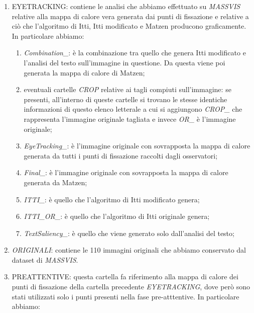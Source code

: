 \documentclass[%
	corpo=12pt,
    twoside,
    stile=classica,
    oldstyle,
    tipotesi=custom,
    greek,
    evenboxes,
]{toptesi}
\begin{document}
{\begin{itemize}
\begin{enumerate}
\begin{enumerate}
		\item \textit{EyeTracking\_}: immagine che contiene l’immagine originale alla quale viene sovrapposta la mappa di calore in base ai punti di fissazione;
		\item \textit{POLY\_AND\_POINTS\_}: Immagine con solo i poligoni disegnati su sfondo bianco e con i punti di fissazione che sono stati rappresentati all’interno del poligono opportuno;
		\item \textit{POLY\_ON\_IMG\_}: immagine con i poligoni sovrapposti all’immagine.
		\end{enumerate}
	\item EYETRACKING: contiene le analisi che abbiamo effettuato su \textit{MASSVIS} relative alla mappa di calore vera generata dai punti di fissazione e relative a ciò che l’algoritmo di Itti, Itti modificato e Matzen producono graficamente. In particolare abbiamo:
		\begin{enumerate}
		\item \textit{Combination\_}: è la combinazione tra quello che genera Itti modificato e l’analisi del testo sull’immagine in questione. Da questa viene poi generata la mappa di calore di Matzen;
		\item eventuali cartelle \textit{CROP} relative ai tagli compiuti sull’immagine: se presenti, all’interno di queste cartelle si trovano le stesse identiche informazioni di questo elenco letterale a cui si aggiungono \textit{CROP\_} che rappresenta l’immagine originale tagliata e invece \textit{OR\_} è l’immagine originale;
		\item \textit{EyeTracking\_}: è l’immagine originale con sovrapposta la mappa di calore generata da tutti i punti di fissazione raccolti dagli osservatori;
		\item \textit{Final\_}: è l’immagine originale con sovrapposta la mappa di calore generata da Matzen;
		\item \textit{ITTI\_}: è quello che l’algoritmo di Itti modificato genera;
		\item \textit{ITTI\_OR\_}: è quello che l’algoritmo di Itti originale genera;
		\item \textit{TextSaliency\_}: è quello che viene generato solo dall’analisi del testo;
		\end{enumerate}
	\item \textit{ORIGINALI}: contiene le 110 immagini originali che abbiamo conservato dal dataset di \textit{MASSVIS}.
	\item PREATTENTIVE: questa cartella fa riferimento alla mappa di calore dei punti di fissazione della cartella precedente \textit{EYETRACKING}, dove però sono stati utilizzati solo i punti presenti nella fase pre-atttentive. In particolare abbiamo:

\end{enumerate}
\end{itemize}}
\end{document}

